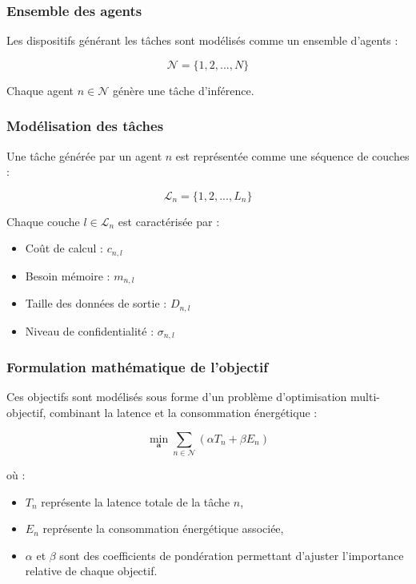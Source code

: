 \documentclass[12pt,a4paper]{report}
\begin{document}
\subsubsection{Ensemble des agents}

Les dispositifs générant les tâches sont modélisés comme un ensemble d’agents :

\begin{equation}
\mathcal{N} = \{1, 2, ..., N\}
\end{equation}

Chaque agent $n \in \mathcal{N}$ génère une tâche d’inférence.

\subsubsection{Modélisation des tâches}

Une tâche générée par un agent $n$ est représentée comme une séquence de couches :

\begin{equation}
\mathcal{L}_n = \{1, 2, ..., L_n\}
\end{equation}

Chaque couche $l \in \mathcal{L}_n$ est caractérisée par :

\begin{itemize}
    \item Coût de calcul : $c_{n,l}$
    \item Besoin mémoire : $m_{n,l}$
    \item Taille des données de sortie : $D_{n,l}$
    \item Niveau de confidentialité : $\sigma_{n,l}$
\end{itemize}

\subsubsection{Formulation mathématique de l’objectif}

Ces objectifs sont modélisés sous forme d’un problème d’optimisation multi-objectif, combinant la latence et la consommation énergétique :

\begin{equation}
\min_{\mathbf{a}} \sum_{n \in \mathcal{N}} \left( \alpha T_n + \beta E_n \right)
\end{equation}

où :
\begin{itemize}
    \item $T_n$ représente la latence totale de la tâche $n$,
    \item $E_n$ représente la consommation énergétique associée,
    \item $\alpha$ et $\beta$ sont des coefficients de pondération permettant d’ajuster l’importance relative de chaque objectif.
\end{itemize}
\end{document}
